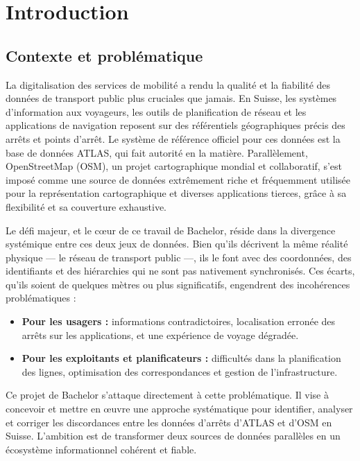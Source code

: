 
\chapter*{Introduction}

\section*{Contexte et problématique}

La digitalisation des services de mobilité a rendu la qualité et la fiabilité des données de transport public plus cruciales que jamais. En Suisse, les systèmes d'information aux voyageurs, les outils de planification de réseau et les applications de navigation reposent sur des référentiels géographiques précis des arrêts et points d'arrêt. Le système de référence officiel pour ces données est la base de données ATLAS, qui fait autorité en la matière. Parallèlement, OpenStreetMap (OSM), un projet cartographique mondial et collaboratif, s'est imposé comme une source de données extrêmement riche et fréquemment utilisée pour la représentation cartographique et diverses applications tierces, grâce à sa flexibilité et sa couverture exhaustive.

Le défi majeur, et le cœur de ce travail de Bachelor, réside dans la divergence systémique entre ces deux jeux de données. Bien qu'ils décrivent la même réalité physique — le réseau de transport public —, ils le font avec des coordonnées, des identifiants et des hiérarchies qui ne sont pas nativement synchronisés. Ces écarts, qu'ils soient de quelques mètres ou plus significatifs, engendrent des incohérences problématiques :

\begin{itemize}
    \item \textbf{Pour les usagers :} informations contradictoires, localisation erronée des arrêts sur les applications, et une expérience de voyage dégradée.
    
    \item \textbf{Pour les exploitants et planificateurs :} difficultés dans la planification des lignes, optimisation des correspondances et gestion de l'infrastructure.
\end{itemize}

Ce projet de Bachelor s'attaque directement à cette problématique. Il vise à concevoir et mettre en œuvre une approche systématique pour identifier, analyser et corriger les discordances entre les données d'arrêts d'ATLAS et d'OSM en Suisse. L'ambition est de transformer deux sources de données parallèles en un écosystème informationnel cohérent et fiable.


